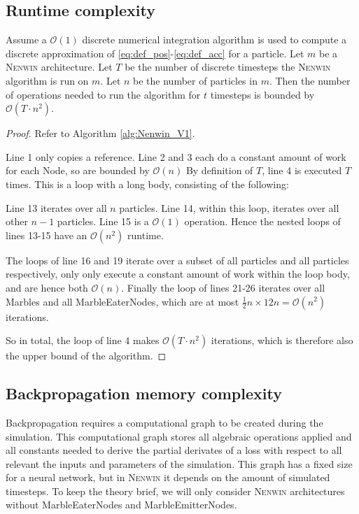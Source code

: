 \subsection{Runtime complexity}
\begin{lemma}
Assume a $\mathcal{O}(1)$ discrete numerical integration algorithm is used to compute a discrete approximation of \eqref{eq:def_pos}-\eqref{eq:def_acc} for a particle. Let $m$ be a \textsc{Nenwin} architecture. Let $T$ be the number of discrete timesteps the \textsc{Nenwin} algorithm is run on $m$. Let $n$ be the number of particles in $m$. Then the number of operations needed to run the algorithm for $t$ timesteps is bounded by $\mathcal{O}(T\cdot n^2)$.\label{lemma:runtime_complexity}
\end{lemma}
\begin{proof}
Refer to Algorithm \ref{alg:Nenwin_V1}. 

Line 1 only copies a reference. Line 2 and 3 each do a constant amount of work for each Node, so are bounded by $\mathcal{O}(n)$
By definition of $T$, line 4 is executed $T$ times. This is a loop with a long body, consisting of the following: 

Line 13 iterates over all $n$ particles. Line 14, within this loop, iterates over all other $n-1$ particles. Line 15 is a $\mathcal{O}(1)$ operation. Hence the nested loops of lines 13-15 have an $\mathcal{O}(n^2)$ runtime.

The loops of line 16 and 19 iterate over a subset of all particles and all particles respectively, only only execute a constant amount of work within the loop body, and are hence both $\mathcal{O}(n)$. Finally the loop of lines 21-26 iterates over all Marbles and all MarbleEaterNodes, which are at most $\frac{1}{2}n \times {1}{2}n = \mathcal{O}(n^2)$ iterations.

So in total, the loop of line 4 makes $\mathcal{O}(T \cdot n^ 2)$ iterations, which is therefore also the upper bound of the algorithm.
\end{proof}

\subsection{Backpropagation memory complexity}
Backpropagation requires a computational graph to be created during the simulation. This computational graph stores all algebraic operations applied and all constants needed to derive the partial derivates of a loss with respect to all relevant the inputs and parameters of the simulation. This graph has a fixed size for a neural network, but in \textsc{Nenwin} it depends on the amount of simulated timesteps. To keep the theory brief, we will only consider \textsc{Nenwin} architectures without MarbleEaterNodes and MarbleEmitterNodes.

